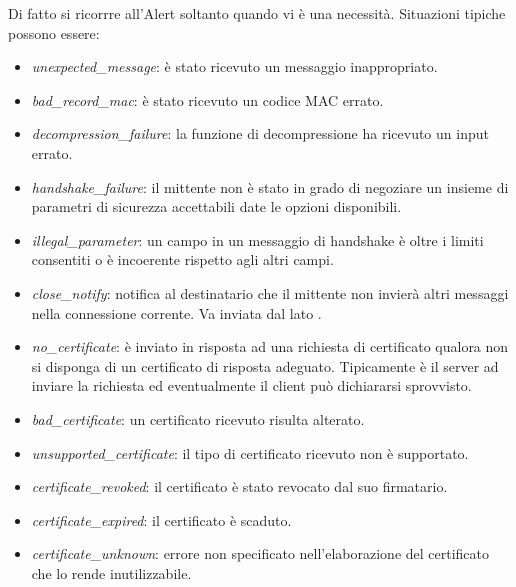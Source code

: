 \documentclass[14pt]{extreport}
\begin{document}
Di fatto si ricorrre all'Alert soltanto quando vi è una necessità. Situazioni tipiche possono essere:


\begin{itemize}
    \item \textit{unexpected\_message}: è stato ricevuto un messaggio inappropriato.
    
    \item \textit{bad\_record\_mac}: è stato ricevuto un codice MAC errato.
    
    
    \item \textit{decompression\_failure}: la funzione di decompressione ha ricevuto un input errato.
    
    
    \item \textit{handshake\_failure}: il mittente non è stato in grado di negoziare un insieme di parametri di sicurezza accettabili date le opzioni disponibili.
    
    
    \item \textit{illegal\_parameter}: un campo in un messaggio di handshake è oltre i limiti consentiti o è incoerente rispetto agli altri campi.
    
    
    \item \textit{close\_notify}: notifica al destinatario che il mittente non invierà altri messaggi nella connessione corrente. Va inviata dal lato .
    
    
    \item \textit{no\_certificate}: è inviato in risposta ad una richiesta di certificato qualora non si disponga di un certificato di risposta adeguato. Tipicamente è il server ad inviare la richiesta ed eventualmente il client può dichiararsi sprovvisto.
    
    
    \item \textit{bad\_certificate}: un certificato ricevuto risulta alterato.
    
    
    \item \textit{unsupported\_certificate}: il tipo di certificato ricevuto non è supportato.
    
    \item \textit{certificate\_revoked}: il certificato è stato revocato dal suo firmatario.
    
    
    \item \textit{certificate\_expired}: il certificato è scaduto.
    
    \item \textit{certificate\_unknown}: errore non specificato nell'elaborazione del certificato che lo rende inutilizzabile.
\end{itemize}
\end{document}
